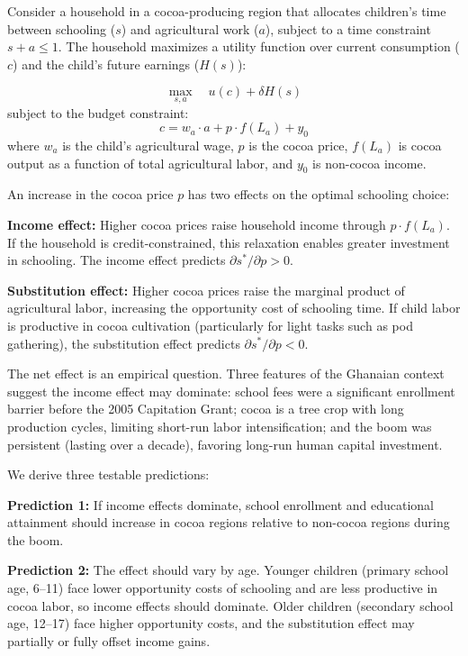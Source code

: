 \documentclass[12pt]{article}
\begin{document}
Consider a household in a cocoa-producing region that allocates children's time between schooling ($s$) and agricultural work ($a$), subject to a time constraint $s + a \leq 1$. The household maximizes a utility function over current consumption ($c$) and the child's future earnings ($H(s)$):

\begin{equation}
\max_{s, a} \quad u(c) + \delta H(s)
\end{equation}
subject to the budget constraint:
\begin{equation}
c = w_a \cdot a + p \cdot f(L_a) + y_0
\end{equation}
where $w_a$ is the child's agricultural wage, $p$ is the cocoa price, $f(L_a)$ is cocoa output as a function of total agricultural labor, and $y_0$ is non-cocoa income.

An increase in the cocoa price $p$ has two effects on the optimal schooling choice:

\textbf{Income effect:} Higher cocoa prices raise household income through $p \cdot f(L_a)$. If the household is credit-constrained, this relaxation enables greater investment in schooling. The income effect predicts $\partial s^* / \partial p > 0$.

\textbf{Substitution effect:} Higher cocoa prices raise the marginal product of agricultural labor, increasing the opportunity cost of schooling time. If child labor is productive in cocoa cultivation (particularly for light tasks such as pod gathering), the substitution effect predicts $\partial s^* / \partial p < 0$.

The net effect is an empirical question. Three features of the Ghanaian context suggest the income effect may dominate: school fees were a significant enrollment barrier before the 2005 Capitation Grant; cocoa is a tree crop with long production cycles, limiting short-run labor intensification; and the boom was persistent (lasting over a decade), favoring long-run human capital investment.

We derive three testable predictions:

\textbf{Prediction 1:} If income effects dominate, school enrollment and educational attainment should increase in cocoa regions relative to non-cocoa regions during the boom.

\textbf{Prediction 2:} The effect should vary by age. Younger children (primary school age, 6--11) face lower opportunity costs of schooling and are less productive in cocoa labor, so income effects should dominate. Older children (secondary school age, 12--17) face higher opportunity costs, and the substitution effect may partially or fully offset income gains.
\end{document}
